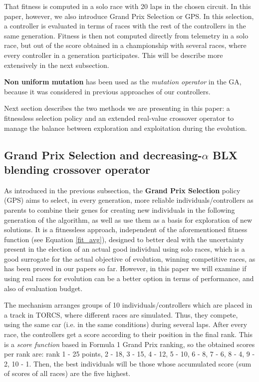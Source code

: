\documentclass[10pt,journal,compsoc]{IEEEtran}
\begin{document}
That fitness is computed in a solo race with 20 laps in the chosen circuit. In this paper, however, we also introduce Grand Prix Selection or GPS. In this
selection, a controller is evaluated in terms of races with the rest
of the controllers in the same generation. Fitness is then not
computed directly from telemetry in a solo race, but out of the score
obtained in a championship with several races, where every controller
in a generation participates. This will be describe more extensively
in the next subsection.

\textbf{Non uniform mutation} \cite{mutation1997} has been used as the
\textit{mutation operator} in the GA, because it was considered in
previous approaches of our controllers. 

Next section describes the two methods we are presenting in
this paper: a fitnessless selection policy and an extended real-value
crossover operator to manage the balance between exploration and
exploitation during the evolution. 

\subsection{Grand Prix Selection and decreasing-$\alpha$ BLX blending crossover operator}
\label{subsec:novel_operators}

As introduced in the previous subsection, the \textbf{Grand Prix Selection} policy (GPS)  aims to select, in every generation, more reliable individuals/controllers as parents to combine their genes for creating new individuals in the following generation of the algorithm, as well as use them as a basis for exploration of new solutions. It is a fitnessless approach,
independent of the aforementioned fitness function (see Equation
\ref{fit_avg}), designed to better deal with the uncertainty present
in the election of an actual good individual using solo races, which
is a good surrogate for the actual objective of evolution, winning
competitive races, as has been proved in our papers so far. However,
in this paper we will examine if using real races for evolution can be
a better option in terms of performance, and also of evaluation
budget. 

The mechanism arranges groups of 10 individuals/controllers which are placed in a track in TORCS, where different races are simulated. Thus, they compete, using the same car (i.e. in the same conditions) during several laps. After every race, the controllers get a score according to their position in the final rank. This is a \textit{score function} based in Formula 1 Grand Prix ranking, so the obtained scores per rank are: rank 1 - 25 points, 2 - 18, 3 - 15, 4 - 12, 5 - 10, 6 - 8, 7 - 6, 8 - 4, 9 - 2, 10 - 1.
Then, the best individuals will be those whose accumulated score (sum of scores of all races) are the five highest.
\end{document}

